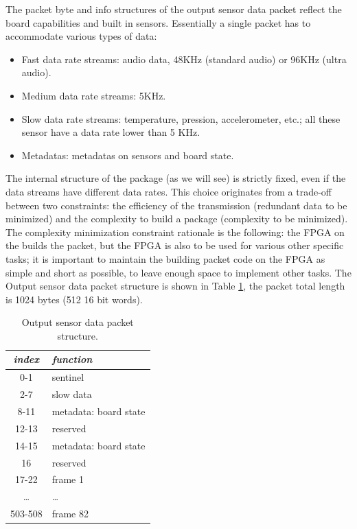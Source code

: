 \documentclass{article} \usepackage{times}
\begin{document}
The packet byte and info structures of the output sensor data packet
reflect the board capabilities and built in sensors.  Essentially a
single packet has to accommodate various types of data:

\begin{itemize}
\item Fast data rate streams: audio data, 48KHz (standard audio) or
  96KHz (ultra audio).
\item Medium data rate streams: 5KHz.
\item Slow data rate streams: temperature, pression, accelerometer,
  etc.; all these sensor have a data rate lower than 5 KHz.
\item Metadatas: metadatas on sensors and board state.
\end{itemize}

The internal structure of the package (as we will see) is strictly
fixed, even if the data streams have different data rates.  This
choice originates from a trade-off between two constraints: the
efficiency of the transmission (redundant data to be minimized) and
the complexity to build a package (complexity to be minimized).  The
complexity minimization constraint rationale is the following: the
FPGA on the \STSB builds the packet, but the FPGA is also to be used
for various other specific tasks; it is important to maintain the
building packet code on the FPGA as simple and short as possible, to
leave enough space to implement other tasks.  The Output sensor data
packet structure is shown in Table \ref{tab:data_packet_structure},
the packet total length is 1024 bytes (512 16 bit words).

\begin{table}[htbp]
  \caption{Output sensor data packet structure.}
  \label{tab:data_packet_structure}
  \begin{center}
    \begin{tabular}{|c|l|}\hline
      \textbf{\textit{index}} & \textbf{\textit{function}}\\\hline
      0-1 & sentinel\\\hline
      2-7 & slow data\\\hline
      8-11 & metadata: board state\\\hline
      12-13 & reserved\\\hline
      14-15 & metadata: board state\\\hline
      16 & reserved\\\hline
      17-22 & frame 1\\\hline
      \ldots & \ldots\\\hline
      503-508 & frame 82\\\hline
    \end{tabular}
  \end{center}
\end{table}
\end{document}
